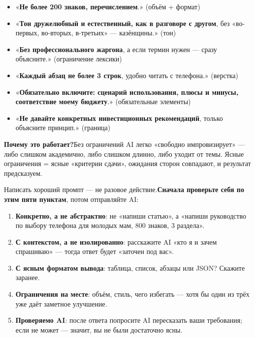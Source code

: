 \begin{itemize}
  \item «\textbf{Не более 200 знаков, перечислением}.» (объём + формат)
  \item «\textbf{Тон дружелюбный и естественный, как в разговоре с другом}, без «во-первых, во-вторых, в-третьих» — казёнщины.» (тон)
  \item «\textbf{Без профессионального жаргона}, а если термин нужен — сразу объясните.» (ограничение лексики)
  \item «\textbf{Каждый абзац не более 3 строк}, удобно читать с телефона.» (верстка)
  \item «\textbf{Обязательно включите: сценарий использования, плюсы и минусы, соответствие моему бюджету}.» (обязательные элементы)
  \item «\textbf{Не давайте конкретных инвестиционных рекомендаций}, только объясните принцип.» (граница)
\end{itemize}

\textbf{Почему это работает?}Без ограничений AI легко «свободно импровизирует» — либо слишком академично, либо слишком длинно, либо уходит от темы. Ясные ограничения = ясные «критерии сдачи», ожидания сторон совпадают, и результат предсказуем.


Написать хороший промпт — не разовое действие.\textbf{Сначала проверьте себя по этим пяти пунктам}, потом отправляйте AI:

\begin{enumerate}
  \item \textbf{Конкретно, а не абстрактно}: не «напиши статью», а «напиши руководство по выбору телефона для молодых мам, 800 знаков, 3 раздела».
  \item \textbf{С контекстом, а не изолированно}: расскажите AI «кто я и зачем спрашиваю» — тогда ответ будет «заточен под вас».
  \item \textbf{С ясным форматом вывода}: таблица, список, абзацы или JSON? Скажите заранее.
  \item \textbf{Ограничения на месте}: объём, стиль, чего избегать — хотя бы один из трёх уже даёт заметное улучшение.
  \item \textbf{Проверяемо AI}: после ответа попросите AI пересказать ваши требования; если не может — значит, вы не были достаточно ясны.
\end{enumerate}


